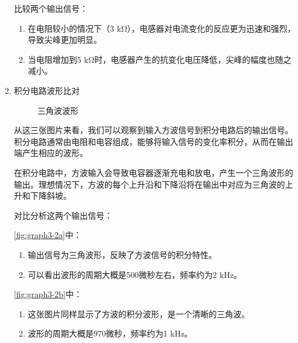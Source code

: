 \documentclass[dvipsnames, svgnames,a4paper,11pt]{article}
\begin{document}
\begin{enumerate}
		
		比较两个输出信号：
		\begin{enumerate}
			\item 在电阻较小的情况下（3 kΩ），电感器对电流变化的反应更为迅速和强烈，导致尖峰更加明显。
			\item 当电阻增加到5 kΩ时，电感器产生的抗变化电压降低，尖峰的幅度也随之减小。
		\end{enumerate}

	
		
		\item 积分电路波形比对
		
		\begin{figure}[htbp]
			\centering
			\quad
			\quad
			\quad
			\caption{三角波波形}
			\label{fig:graph3-2}
		\end{figure}


		从这三张图片来看，我们可以观察到输入方波信号到积分电路后的输出信号。积分电路通常由电阻和电容组成，能够将输入信号的变化率积分，从而在输出端产生相应的波形。
		
		在积分电路中，方波输入会导致电容器逐渐充电和放电，产生一个三角波形的输出。理想情况下，方波的每个上升沿和下降沿将在输出中对应为三角波的上升和下降斜坡。
		
		对比分析这两个输出信号：

		\cref{fig:graph3-2a}中：
		\begin{enumerate}
			\item 输出信号为三角波形，反映了方波信号的积分特性。
			\item 可以看出波形的周期大概是500微秒左右，频率约为2 kHz。
		\end{enumerate}

		
		\cref{fig:graph3-2b}中：
		\begin{enumerate}
			\item 这张图片同样显示了方波的积分波形，是一个清晰的三角波。
			\item 波形的周期大概是970微秒，频率约为1 kHz。
		\end{enumerate}

		

\end{enumerate}
\end{document}
